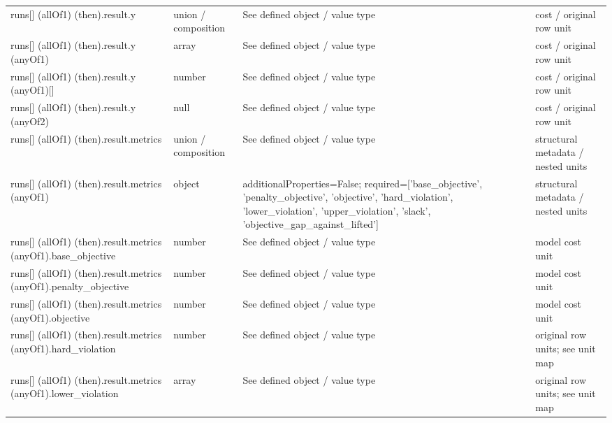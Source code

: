 \begin{longtable}{@{}>{\raggedright\arraybackslash}p{}>{\raggedright\arraybackslash}p{}>{\raggedright\arraybackslash}p{}>{\raggedright\arraybackslash}p{}@{}}
runs[] (allOf1) (then).\allowbreak{}result.\allowbreak{}y & union /\allowbreak{} composition & See defined object /\allowbreak{} value type & cost /\allowbreak{} original row unit\\
runs[] (allOf1) (then).\allowbreak{}result.\allowbreak{}y (anyOf1) & array & See defined object /\allowbreak{} value type & cost /\allowbreak{} original row unit\\
runs[] (allOf1) (then).\allowbreak{}result.\allowbreak{}y (anyOf1)[] & number & See defined object /\allowbreak{} value type & cost /\allowbreak{} original row unit\\
runs[] (allOf1) (then).\allowbreak{}result.\allowbreak{}y (anyOf2) & null & See defined object /\allowbreak{} value type & cost /\allowbreak{} original row unit\\
runs[] (allOf1) (then).\allowbreak{}result.\allowbreak{}metrics & union /\allowbreak{} composition & See defined object /\allowbreak{} value type & structural metadata /\allowbreak{} nested units\\
runs[] (allOf1) (then).\allowbreak{}result.\allowbreak{}metrics (anyOf1) & object & additionalProperties=\allowbreak{}False; required=\allowbreak{}['base\_\allowbreak{}objective', 'penalty\_\allowbreak{}objective', 'objective', 'hard\_\allowbreak{}violation', 'lower\_\allowbreak{}violation', 'upper\_\allowbreak{}violation', 'slack', 'objective\_\allowbreak{}gap\_\allowbreak{}against\_\allowbreak{}lifted'] & structural metadata /\allowbreak{} nested units\\
runs[] (allOf1) (then).\allowbreak{}result.\allowbreak{}metrics (anyOf1).\allowbreak{}base\_\allowbreak{}objective & number & See defined object /\allowbreak{} value type & model cost unit\\
runs[] (allOf1) (then).\allowbreak{}result.\allowbreak{}metrics (anyOf1).\allowbreak{}penalty\_\allowbreak{}objective & number & See defined object /\allowbreak{} value type & model cost unit\\
runs[] (allOf1) (then).\allowbreak{}result.\allowbreak{}metrics (anyOf1).\allowbreak{}objective & number & See defined object /\allowbreak{} value type & model cost unit\\
runs[] (allOf1) (then).\allowbreak{}result.\allowbreak{}metrics (anyOf1).\allowbreak{}hard\_\allowbreak{}violation & number & See defined object /\allowbreak{} value type & original row units; see unit map\\
runs[] (allOf1) (then).\allowbreak{}result.\allowbreak{}metrics (anyOf1).\allowbreak{}lower\_\allowbreak{}violation & array & See defined object /\allowbreak{} value type & original row units; see unit map\\

\end{longtable}
